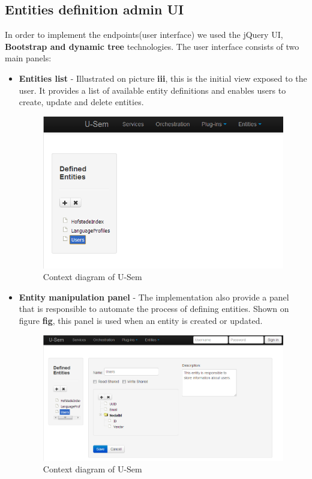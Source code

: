 \documentclass[a4paper, notitlepage]{article}
\begin{document}
\subsection{Entities definition admin UI}
In order to implement the endpoints(user interface) we used the jQuery UI, \textbf{Bootstrap and dynamic tree} technologies. The user interface consists of two main panels:
	\begin{itemize}
	
		\item \textbf{Entities list} - Illustrated on picture \textbf{iii}, this is the initial view exposed to the user. It provides a list of available entity definitions and enables users to create, update and delete entities.
		
\begin{figure}[h!]
  \centering
  	\includegraphics[scale=0.5]{ui/entityList.png}
  \caption{Context diagram of U-Sem }
  \label{fig_context}
\end{figure}
		
		\item \textbf{Entity manipulation panel} - The implementation also provide a panel that is responsible to automate the process of defining entities. Shown on figure \textbf{fig}, this panel is used when an entity is created or updated.
		
\begin{figure}[h!]
  \centering
  	\includegraphics[scale=0.5]{ui/entityPanel.png}
  \caption{Context diagram of U-Sem }
  \label{fig_context}
\end{figure}

	\end{itemize}
\end{document}

